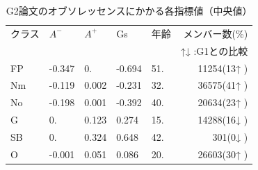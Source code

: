 \begin{table}
\begin{center}
\caption{G2論文のオブソレッセンスにかかる各指標値（中央値）} \label{tab:g2obsindex}
\begin{tabular}{lllllr}
クラス & $A^-$ & $A^+$ & Gs & 年齢 & メンバー数(\%)\\
&  &  &  &  & ↑↓ :G1との比較\\
\hline
FP & -0.347 & 0. & -0.694 & 51. & 11254(13↑ ) \\
Nm & -0.119 & 0.002 & -0.231 & 32. & 36575(41↑ ) \\
No & -0.198 & 0.001 & -0.392 & 40. & 20634(23↑ ) \\
G & 0. & 0.123 & 0.274 & 15. & 14288(16↓ ) \\
SB & 0. & 0.324 & 0.648 & 42. & 301(0↓ ) \\
O & -0.001 & 0.051 & 0.086 & 20. & 26603(30↑ ) \\
\end{tabular}
\end{center}
\end{table}
